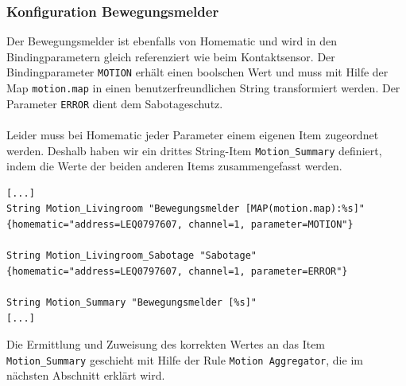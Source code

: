 \subsubsection{Konfiguration Bewegungsmelder}
Der Bewegungsmelder ist ebenfalls von Homematic und wird in den Bindingparametern gleich referenziert wie beim Kontaktsensor. Der Bindingparameter \lstinline!MOTION! erhält einen boolschen Wert und muss mit Hilfe der Map \lstinline!motion.map! in einen benutzerfreundlichen String transformiert werden. Der Parameter \lstinline!ERROR! dient dem Sabotageschutz.\\ \\
Leider muss bei Homematic jeder Parameter einem eigenen Item zugeordnet werden. Deshalb haben wir ein drittes String-Item \lstinline!Motion_Summary! definiert, indem die Werte der beiden anderen Items zusammengefasst werden. 


\begin{lstlisting}[style=csharp, caption=demo.items - Bewegungsmelder Items]
[...]
String Motion_Livingroom "Bewegungsmelder [MAP(motion.map):%s]"
{homematic="address=LEQ0797607, channel=1, parameter=MOTION"}

String Motion_Livingroom_Sabotage "Sabotage"
{homematic="address=LEQ0797607, channel=1, parameter=ERROR"}

String Motion_Summary "Bewegungsmelder [%s]"
[...]
\end{lstlisting}

Die Ermittlung und Zuweisung des korrekten Wertes an das Item \lstinline!Motion_Summary! geschieht mit Hilfe der Rule \lstinline!Motion Aggregator!, die im nächsten Abschnitt erklärt wird.

